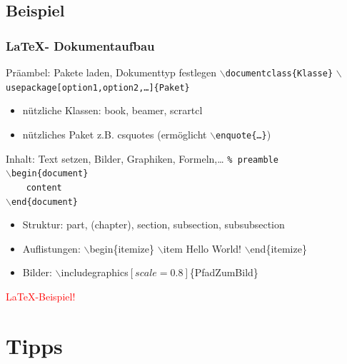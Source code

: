 \documentclass[18pt]{beamer}
\begin{document}
	\subsection{Beispiel}
	\begin{frame}
		\frametitle{\LaTeX - Dokumentaufbau}
		\begin{block}{Präambel: Pakete laden, Dokumenttyp festlegen}
			\texttt{$\backslash$documentclass\{Klasse\}} \newline
			\texttt{$\backslash$usepackage[option1,option2,\dots]\{Paket\}}
		\end{block}
		\begin{itemize}
			\item nützliche Klassen: book, beamer, scrartcl
			\item nützliches Paket z.B. csquotes (ermöglicht \texttt{$\backslash$enquote\{\dots\}})
		\end{itemize}
	\pause
		\begin{block}{Inhalt: Text setzen, Bilder, Graphiken, Formeln,\dots}
			\texttt{\% preamble \\ $\backslash$begin\{document\} \\ ~~~~content \\ $\backslash$end\{document\}}
		\end{block}
			\begin{itemize}
				\item Struktur: part, (chapter), section, subsection, subsubsection
				\item Auflistungen: $\backslash$begin\{itemize\} $\backslash$item Hello World! $\backslash$end\{itemize\}
				\item Bilder: $\backslash$includegraphics$[scale=0.8]$\{PfadZumBild\}
			\end{itemize}
	\end{frame}

\begin{frame}{}
	\huge \centering \textcolor{red}{\LaTeX-Beispiel!}
\end{frame}
		
\section{Tipps}
\end{document}
